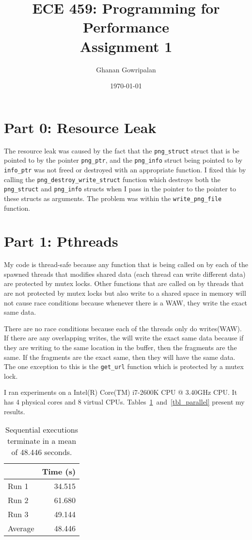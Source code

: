 \documentclass[12pt]{article}
\title{ECE 459: Programming for Performance\\Assignment 1}
\author{Ghanan Gowripalan}
\date{\today}
\newcommand{\physicalcores}{4}
\newcommand{\virtualcpus}{8}
\begin{document}
\maketitle

\section*{Part 0: Resource Leak}

The resource leak was caused by the fact that the {\tt png\_struct} struct that is be pointed to by the pointer {\tt png\_ptr}, and the {\tt png\_info} struct being pointed to by {\tt info\_ptr} was not freed or destroyed with an appropriate function. I fixed this by calling the {\tt png\_destroy\_write\_struct} function which destroys both the {\tt png\_struct} and {\tt png\_info} structs when I pass in the pointer to the pointer to these structs as arguments. The problem was within the {\tt write\_png\_file} function.

\section*{Part 1: Pthreads}

My code is thread-safe because any function that is being called on by each of the spawned threads that modifies shared data (each thread can write different data) are protected by mutex locks. Other functions that are called on by threads that are not protected by mutex locks but also write to a shared space in memory will not cause race conditions because whenever there is a WAW, they write the exact same data.

There are no race conditions because each of the threads only do writes(WAW). If there are any overlapping writes, the will write the exact same data because if they are writing to the same location in the buffer, then the fragments are the same. If the fragments are the exact same, then they will have the same data. The one exception to this is the {\tt get\_url} function which is protected by a mutex lock.

I ran experiments on a Intel(R) Core(TM) i7-2600K CPU @ 3.40GHz CPU. It has \physicalcores{} physical cores and \virtualcpus{} virtual
CPUs. Tables~\ref{tbl_sequential}~and~\ref{tbl_parallel} present my results.

\begin{table}[H]
  \centering
  \begin{tabular}{lr}
    & {\bf Time (s)} \\
    \hline
    Run 1 & 34.515 \\
    Run 2 & 61.680 \\
    Run 3 & 49.144 \\
    \hline
    Average & 48.446 \\
  \end{tabular}
  \caption{\label{tbl_sequential}Sequential executions terminate in a mean of 48.446 seconds.}
\end{table}
\end{document}
